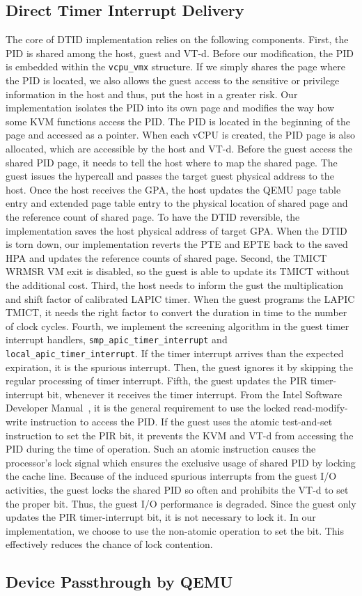\subsection{Direct Timer Interrupt Delivery}
The core of DTID implementation relies on the following
components. First, the PID is shared among the host, guest and
VT-d. Before our modification, the PID is embedded within the
\texttt{vcpu\_vmx} structure. If we simply shares the page
where the PID is located, we also allows the guest access to
the sensitive or privilege information in the host and thus,
put the host in a greater risk. Our implementation isolates
the PID into its own page and modifies the way how some KVM
functions access the PID. The PID is located in the beginning
of the page and accessed as a pointer. When each vCPU is
created, the PID page is also allocated, which are accessible
by the host and VT-d. Before the guest access the shared PID
page, it needs to tell the host where to map the shared page.
The guest issues the hypercall and passes the target guest
physical address to the host. Once the host receives the GPA,
the host updates the QEMU page table entry and extended page
table entry to the physical location of shared page and the
reference count of shared page. To have the DTID reversible,
the implementation saves the host physical address of target
GPA. When the DTID is torn down, our implementation reverts
the PTE and EPTE back to the saved HPA and updates the
reference counts of shared page. Second, the TMICT WRMSR VM
exit is disabled, so the guest is able to update its TMICT
without the additional cost. Third, the host needs to inform
the gust the multiplication and shift factor of calibrated
LAPIC timer. When the guest programs the LAPIC TMICT, it needs
the right factor to convert the duration in time to the number
of clock cycles. Fourth, we implement the screening algorithm
in the guest timer interrupt handlers,
\texttt{smp\_apic\_timer\_interrupt} and
\texttt{local\_apic\_timer\_interrupt}. If the timer interrupt
arrives than the expected expiration, it is the spurious
interrupt. Then, the guest ignores it by skipping the regular
processing of timer interrupt. Fifth, the guest updates the
PIR timer-interrupt bit, whenever it receives the timer
interrupt. From the Intel Software Developer
Manual~\cite{sdm:2018}, it is the general requirement to use
the locked read-modify-write instruction to access the PID. If
the guest uses the atomic test-and-set instruction to set the
PIR bit, it prevents the KVM and VT-d from accessing the PID
during the time of operation. Such an atomic instruction
causes the processor's lock signal which ensures the exclusive
usage of shared PID by locking the cache line. Because of the
induced spurious interrupts from the guest I/O activities, the
guest locks the shared PID so often and prohibits the VT-d to
set the proper bit. Thus, the guest I/O performance is
degraded. Since the guest only updates the PIR timer-interrupt
bit, it is not necessary to lock it. In our implementation, we
choose to use the non-atomic operation to set the bit. This
effectively reduces the chance of lock contention.

\subsection{Device Passthrough by QEMU}

